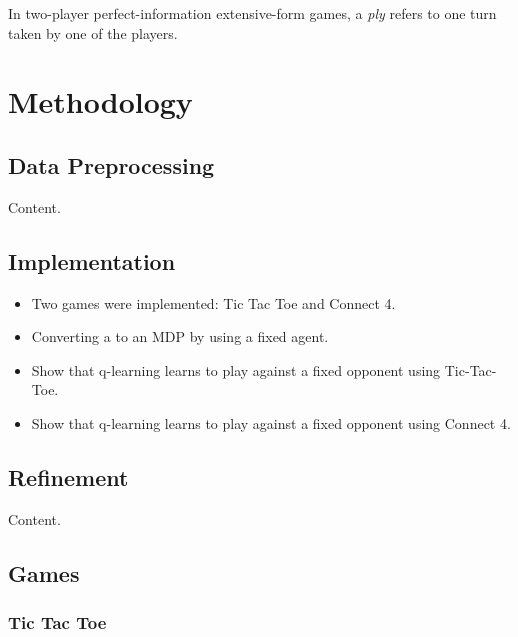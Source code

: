 \documentclass{article}
\begin{document}
In two-player perfect-information extensive-form games, a \emph{ply} refers to one turn taken by one
of the players.

\section{Methodology}

\subsection{Data Preprocessing}

Content.

\subsection{Implementation}

\begin{itemize}

    \item Two games were implemented: Tic Tac Toe and Connect 4.
    \item Converting a to an MDP by using a fixed agent.
    \item Show that q-learning learns to play against a fixed opponent using Tic-Tac-Toe.
    \item Show that q-learning learns to play against a fixed opponent using Connect 4.

\end{itemize}

\subsection{Refinement}

Content.

\subsection{Games}

\subsubsection{Tic Tac Toe}
\end{document}
